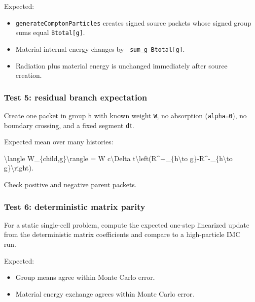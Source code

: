 \documentclass[
]{article}
\newenvironment{Shaded}{}{}
\newcommand{\NormalTok}[1]{#1}
\providecommand{\tightlist}{%
  \setlength{\itemsep}{0pt}\setlength{\parskip}{0pt}}
\begin{document}
Expected:

\begin{itemize}
\tightlist
\item
  \texttt{generateComptonParticles} creates signed source packets whose
  signed group sums equal \texttt{Btotal{[}g{]}}.
\item
  Material internal energy changes by \texttt{-sum\_g\ Btotal{[}g{]}}.
\item
  Radiation plus material energy is unchanged immediately after source
  creation.
\end{itemize}

\subsubsection{Test 5: residual branch
expectation}\label{test-5-residual-branch-expectation}

Create one packet in group \texttt{h} with known weight \texttt{W}, no
absorption (\texttt{alpha=0}), no boundary crossing, and a fixed segment
\texttt{dt}.

Expected mean over many histories:

\begin{Shaded}
\begin{Highlighting}[]
\NormalTok{\textbackslash{}langle W\_\{child,g\}\textbackslash{}rangle}
\NormalTok{= W c\textbackslash{}Delta t\textbackslash{}left(R\^{}+\_\{h\textbackslash{}to g\}{-}R\^{}{-}\_\{h\textbackslash{}to g\}\textbackslash{}right).}
\end{Highlighting}
\end{Shaded}

Check positive and negative parent packets.

\subsubsection{Test 6: deterministic matrix
parity}\label{test-6-deterministic-matrix-parity}

For a static single-cell problem, compute the expected one-step
linearized update from the deterministic matrix coefficients and compare
to a high-particle IMC run.

Expected:

\begin{itemize}
\tightlist
\item
  Group means agree within Monte Carlo error.
\item
  Material energy exchange agrees within Monte Carlo error.
\end{itemize}
\end{document}
